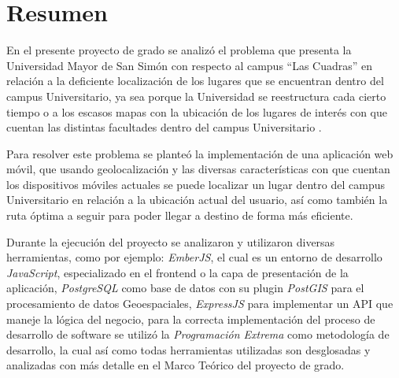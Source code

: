 \chapter*{Resumen} %





En el presente proyecto de grado se analizó el problema que presenta la Universidad Mayor de San Simón con respecto al campus ``Las Cuadras'' en relación a la deficiente localización de los lugares que se encuentran dentro del campus Universitario, ya sea porque la Universidad se reestructura cada cierto tiempo o a los escasos mapas con la ubicación de los lugares de interés con que cuentan las distintas facultades dentro del campus Universitario .

Para resolver este problema se planteó la implementación de una aplicación web móvil, que usando geolocalización y las diversas características con que cuentan los dispositivos móviles actuales se puede localizar un lugar dentro del campus Universitario en relación a la ubicación actual del usuario, así como también la ruta óptima a seguir para poder llegar a destino de forma más eficiente.

Durante la ejecución del proyecto se analizaron y utilizaron diversas herramientas, como por ejemplo: \emph{EmberJS}, el cual es un entorno de desarrollo \emph{JavaScript}, especializado en el frontend o la capa de presentación de la aplicación, \emph{PostgreSQL} como base de datos con su plugin \emph{PostGIS} para el procesamiento de datos Geoespaciales, \emph{ExpressJS} para implementar un API que maneje la lógica del negocio, para la correcta implementación del proceso de desarrollo de software se utilizó la \emph{Programación Extrema} como metodología de desarrollo, la cual así como todas herramientas utilizadas son desglosadas y analizadas  con más detalle en el Marco Teórico del proyecto de grado.

